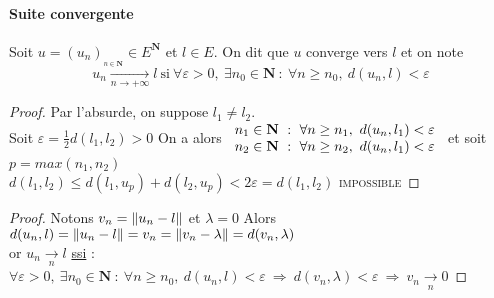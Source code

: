 		\vspace{-15pt}
		\traitd 
		\paragraph{Suite convergente}	
			Soit $u=\left( u_n\right)_{_{n\in\mathbf{N}}} \in E^{\mathbf{N}}$ et $l\in E$.
			On dit que $u$ converge vers $l$ et on note \[u_n \underset{n\rightarrow +\infty}{\longrightarrow} l ~\mathrm{si}~\forall 
			\varepsilon >0 ,~\exists n_0 \in \mathbf{N} ~:~ \forall n\geq n_0,~d(u_n ,l) <\varepsilon\] 
		\trait 
			
			
		\begin{proof}
			Par l'absurde, on suppose $l_1\neq l_2$.\\
			Soit $\varepsilon = \frac{1}{2} d(l_1,l_2) >0$
			On a alors $\begin{array}{l} n_1 \in \mathbf{N} ~:~\forall n\geq n_1 ,~d(u_n,l_1) < \varepsilon \\  
			n_2 \in \mathbf{N} ~:~\forall n\geq n_2 ,~d(u_n,l_1) < \varepsilon \end{array} $  et soit $p=max(n_1,n_2)$ \vspace*{0.1cm}\\
			$d(l_1,l_2) \leq d(l_1,u_p) + d(l_2,u_p) < 2\varepsilon = d(l_1,l_2)$  \textsc{impossible}
		\end{proof} \medskip
		
		
		\begin{proof}
			Notons $v_n = \left\Vert u_n-l \right\Vert$ et $\lambda = 0$
			Alors $d(u_n,l) = \left\Vert u_n - l \right\Vert = v_n = \left\Vert v_n - \lambda \right\Vert = d(v_n,\lambda )$ \\
			or $u_n \underset{n}{\rightarrow} l$ \underline{ssi} : $\forall \varepsilon >0 ,~\exists n_0 \in \mathbf{N} ~:~ 
			\forall n\geq n_0,~d(u_n ,l) <\varepsilon ~\Rightarrow ~ d(v_n,\lambda)<\varepsilon ~\Rightarrow ~ v_n \underset{n}{\rightarrow} 0$
		\end{proof} \medskip

